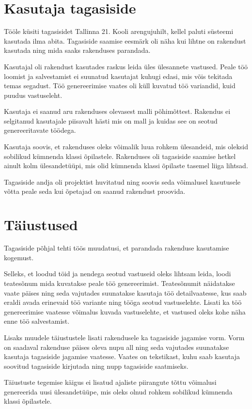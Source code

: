 \section{Kasutaja tagasiside}

Tööle küsiti tagasisidet Tallinna 21. Kooli arengujuhilt, kellel paluti süsteemi kasutada ilma abita. Tagasiside saamise eesmärk oli näha kui lihtne on rakendust kasutada ning mida saaks rakenduses parandada.

Kasutajal oli rakendust kasutades raskus leida üles ülesannete vastused. Peale töö loomist ja salvestamist ei suunatud kasutajat kuhugi edasi, mis võis tekitada temas segadust. Töö genereerimise vaates oli küll kuvatud töö variandid, kuid puudus vastuseleht.

Kasutaja ei saanud aru rakenduses olevasest malli põhimõttest. Rakendus ei selgitanud kasutajale piisavalt hästi mis on mall ja kuidas see on seotud genereeritavate töödega.

Kasutaja soovis, et rakenduses oleks võimalik luua rohkem ülesandeid, mis oleksid sobilikud kümnenda klassi õpilastele. Rakenduses oli tagasiside saamise hetkel ainult kolm ülesandetüüpi, mis olid kümnenda klassi õpilaste tasemel liiga lihtsad.

Tagasiside andja oli projektist huvitatud ning soovis seda võimalusel kasutusele võtta peale seda kui õpetajad on saanud rakendust proovida.

\section{Täiustused}

Tagasiside põhjal tehti töös muudatusi, et parandada rakenduse kasutamise kogemust.

Selleks, et loodud töid ja nendega seotud vastuseid oleks lihtsam leida, loodi teatesõnum mida kuvatakse peale töö genereerimist. Teatesõnumit näidatakse vaate päises ning seda vajutades suunatakse kasutaja töö detailvaatesse, kus saab eraldi avada erinevaid töö variante ning tööga seotud vastuselehte. Lisati ka töö genereerimise vaatesse võimalus kuvada vastuselehte, et vastused oleks kohe näha enne töö salvestamist.

Lisaks muudele täiustustele lisati rakendusele ka tagasiside jagamise vorm. Vorm on saadaval rakenduse päises oleva nupu all ning seda vajutades suunatakse kasutaja tagasiside jagamise vaatesse. Vaates on tekstikast, kuhu saab kasutaja soovitud tagasiside kirjutada ning nupp tagasiside saatmiseks.

Täiustuste tegemise käigus ei lisatud ajaliste piirangute tõttu võimalusi genereerida uusi ülesandetüüpe, mis oleks olnud rohkem sobilikud kümnenda klassi õpilastele.
